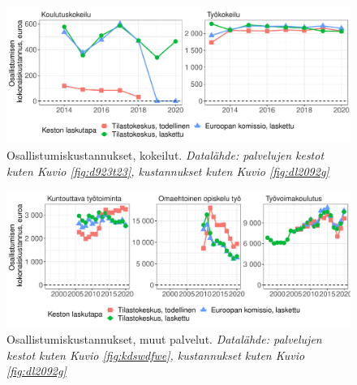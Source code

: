 \documentclass[12pt]{article}
\newcommand{\captionselite}[1] {\textit{\footnotesize{#1}}}
\begin{document}
\begin{figure}
\centering
\includegraphics[scale = 0.6]{../plots/costs/kokeilu_robustness.pdf}
\caption{Osallistumiskustannukset, kokeilut. \captionselite{Datalähde: palvelujen kestot kuten Kuvio \ref{fig:d923t23}, kustannukset kuten Kuvio \ref{fig:dl2092g}}}
   \label{fig:dg03223}
\end{figure}

\begin{figure}
\centering
\includegraphics[scale = 0.6]{../plots/costs/muu_robustness.pdf}
\caption{Osallistumiskustannukset, muut palvelut. \captionselite{Datalähde: palvelujen kestot kuten Kuvio \ref{fig:kdswdfwe}, kustannukset kuten Kuvio \ref{fig:dl2092g}}}
   \label{fig:f9028yt32}
\end{figure}
\end{document}
